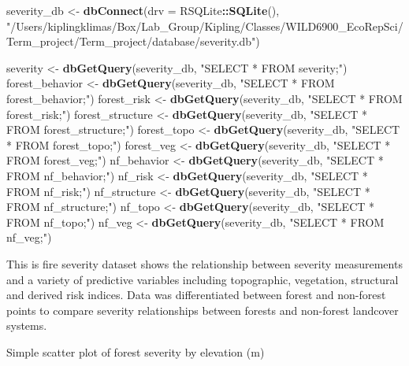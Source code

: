 \documentclass[]{book}
\newenvironment{Shaded}{\begin{snugshade}}{\end{snugshade}}
\newcommand{\DataTypeTok}[1]{\textcolor[rgb]{0.13,0.29,0.53}{#1}}
\newcommand{\KeywordTok}[1]{\textcolor[rgb]{0.13,0.29,0.53}{\textbf{#1}}}
\newcommand{\NormalTok}[1]{#1}
\newcommand{\OperatorTok}[1]{\textcolor[rgb]{0.81,0.36,0.00}{\textbf{#1}}}
\newcommand{\StringTok}[1]{\textcolor[rgb]{0.31,0.60,0.02}{#1}}
\begin{document}
\begin{Shaded}
\begin{Highlighting}[]
\NormalTok{severity_db <-}\StringTok{ }\KeywordTok{dbConnect}\NormalTok{(}\DataTypeTok{drv =}\NormalTok{ RSQLite}\OperatorTok{::}\KeywordTok{SQLite}\NormalTok{(),}
                \StringTok{"/Users/kiplingklimas/Box/Lab_Group/Kipling/Classes/WILD6900_EcoRepSci/Term_project/Term_project/database/severity.db"}\NormalTok{)}

\NormalTok{severity <-}\StringTok{ }\KeywordTok{dbGetQuery}\NormalTok{(severity_db, }\StringTok{"SELECT * FROM severity;"}\NormalTok{)}
\NormalTok{forest_behavior <-}\StringTok{ }\KeywordTok{dbGetQuery}\NormalTok{(severity_db, }\StringTok{"SELECT * FROM forest_behavior;"}\NormalTok{)}
\NormalTok{forest_risk <-}\StringTok{ }\KeywordTok{dbGetQuery}\NormalTok{(severity_db, }\StringTok{"SELECT * FROM forest_risk;"}\NormalTok{)}
\NormalTok{forest_structure <-}\StringTok{ }\KeywordTok{dbGetQuery}\NormalTok{(severity_db, }\StringTok{"SELECT * FROM forest_structure;"}\NormalTok{)}
\NormalTok{forest_topo <-}\StringTok{ }\KeywordTok{dbGetQuery}\NormalTok{(severity_db, }\StringTok{"SELECT * FROM forest_topo;"}\NormalTok{)}
\NormalTok{forest_veg <-}\StringTok{ }\KeywordTok{dbGetQuery}\NormalTok{(severity_db, }\StringTok{"SELECT * FROM forest_veg;"}\NormalTok{)}
\NormalTok{nf_behavior <-}\StringTok{ }\KeywordTok{dbGetQuery}\NormalTok{(severity_db, }\StringTok{"SELECT * FROM nf_behavior;"}\NormalTok{)}
\NormalTok{nf_risk <-}\StringTok{ }\KeywordTok{dbGetQuery}\NormalTok{(severity_db, }\StringTok{"SELECT * FROM nf_risk;"}\NormalTok{)}
\NormalTok{nf_structure <-}\StringTok{ }\KeywordTok{dbGetQuery}\NormalTok{(severity_db, }\StringTok{"SELECT * FROM nf_structure;"}\NormalTok{)}
\NormalTok{nf_topo <-}\StringTok{ }\KeywordTok{dbGetQuery}\NormalTok{(severity_db, }\StringTok{"SELECT * FROM nf_topo;"}\NormalTok{)}
\NormalTok{nf_veg <-}\StringTok{ }\KeywordTok{dbGetQuery}\NormalTok{(severity_db, }\StringTok{"SELECT * FROM nf_veg;"}\NormalTok{)}
\end{Highlighting}
\end{Shaded}

This is fire severity dataset shows the relationship between severity measurements and a variety of predictive variables
including topographic, vegetation, structural and derived risk indices.
Data was differentiated between forest and non-forest points to compare severity relationships between forests and non-forest
landcover systems.

Simple scatter plot of forest severity by elevation (m)
\end{document}
